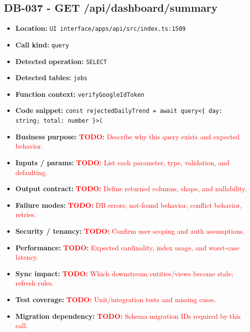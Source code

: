 \documentclass[11pt]{article}
\newcommand{\todoitem}[1]{\textcolor{red}{\textbf{TODO:} #1}}
\begin{document}
\subsection{DB-037 - GET /api/dashboard/summary}
\begin{itemize}[leftmargin=1.5em]
\item \textbf{Location:} \texttt{UI interface/apps/api/src/index.ts:1509}
\item \textbf{Call kind:} \texttt{query}
\item \textbf{Detected operation:} \texttt{SELECT}
\item \textbf{Detected tables:} \texttt{jobs}
\item \textbf{Function context:} \texttt{verifyGoogleIdToken}
\item \textbf{Code snippet:} \texttt{const rejectedDailyTrend = await query<\{ day: string; total: number \}>(}
\item \textbf{Business purpose:} \todoitem{Describe why this query exists and expected behavior.}
\item \textbf{Inputs / params:} \todoitem{List each parameter, type, validation, and defaulting.}
\item \textbf{Output contract:} \todoitem{Define returned columns, shape, and nullability.}
\item \textbf{Failure modes:} \todoitem{DB errors, not-found behavior, conflict behavior, retries.}
\item \textbf{Security / tenancy:} \todoitem{Confirm user scoping and auth assumptions.}
\item \textbf{Performance:} \todoitem{Expected cardinality, index usage, and worst-case latency.}
\item \textbf{Sync impact:} \todoitem{Which downstream entities/views become stale; refresh rules.}
\item \textbf{Test coverage:} \todoitem{Unit/integration tests and missing cases.}
\item \textbf{Migration dependency:} \todoitem{Schema migration IDs required by this call.}
\end{itemize}
\end{document}
